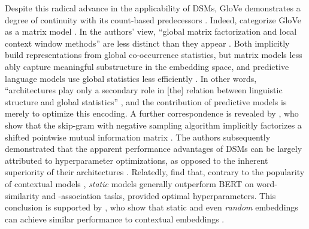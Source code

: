 Despite this radical advance in the applicability of DSMs, GloVe demonstrates a degree
of continuity with its count-based predecessors .
Indeed, \textcites{Lenci2023} categorize GloVe as a matrix model
\parencites*[122]{Lenci2023}.
In the authors' view, ``global matrix factorization and local context window methods''
are less distinct than they appear \parencites[1532]{Pennington2014}.
Both implicitly build representations from global co-occurrence statistics, but matrix
models less ably capture meaningful substructure in the embedding space, and predictive
language models use global statistics less efficiently
\parencites[1541]{Pennington2014}.
In other words, ``architectures play only a secondary role in [the] relation between
linguistic structure and global statistics'' \parencites[164]{Gastaldi2021}, and the
contribution of predictive models is merely to optimize this encoding.
A further correspondence is revealed by \textcites{Levy2014a}, who show that the
skip-gram with negative sampling algorithm \parencites{Mikolov2013} implicitly
factorizes a shifted pointwise mutual information matrix
\parencites[e.g.][116-118]{Jurafsky2023}.
The authors subsequently demonstrated that the apparent performance advantages of DSMs
can be largely attributed to hyperparameter optimizations, as opposed to the inherent
superiority of their architectures \parencites{Levy2015}[cf.][]{Sahlgren2016}.
Relatedly, \textcites{Lenci2022} find that, contrary to the popularity of contextual
models , \emph{static} models generally
outperform BERT \parencites{Devlin2019} on word-similarity and -association tasks,
provided optimal hyperparameters.
This conclusion is supported by \textcites{Arora2020}, who show that static and even
\emph{random} embeddings can achieve similar performance to contextual embeddings
\parencites[see also][5244-5246]{Gupta2019}[4760-4762]{Bommasani2020}.

